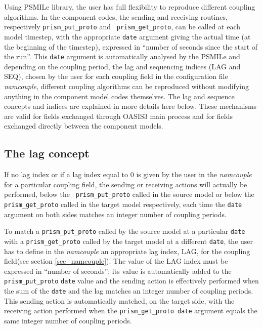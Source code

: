 Using PSMILe library, the user has full flexibility to reproduce
different coupling algorithms. In the component codes, the sending and
receiving routines, respectively {\tt prism\_put\_proto} and {\tt
  prism\_get\_proto}, can be called at each model timestep, with the
appropriate {\tt date} argument giving the actual time (at the
beginning of the timestep), expressed in ``number of seconds since the
start of the run''. This {\tt date} argument is automatically analysed
by the PSMILe
and depending on the coupling period, the
lag and sequencing indices (LAG and SEQ), chosen by the user for each
coupling field in the configuration file {\it namcouple}, different
coupling algorithms can be reproduced without modifying anything in the
component model codes themselves. The lag and sequence concepts and
indices are explained in more details here below. These mechanisms
are valid for fields exchanged through OASIS3 main
process and for fields exchanged directly between the component
models.

\subsection{The lag concept}
\label{subsub_lag}

If no lag index or if a lag index equal to 0 is given by the user in
the {\it namcouple} for a particular coupling field, the sending or
receiving actions will actually be performed, below the {\tt
  prism\_put\_proto} called in the source model or below the {\tt
  prism\_get\_proto} called in the target model respectively, each time the
{\tt date} argument on both sides matches an integer number of
coupling periods.
 
\vspace*{0.5cm}

To match a {\tt prism\_put\_proto} called by the source model at a
particular {\tt date} with a {\tt prism\_get\_proto} called by the target
model at a different {\tt date}, the user has to define in the {\it
namcouple} an appropriate lag index, LAG, for the coupling field(see
section \ref{sec_namcouple}). The value of the LAG index must be
expressed in ``number of seconds''; its value is automatically added
to the {\tt prism\_put\_proto} {\tt date} value and the sending action is
effectively performed when the sum of the {\tt date} and the lag matches an
integer number of coupling periods. This sending action is
automatically matched, on the target side, with the receiving action
performed when the {\tt prism\_get\_proto date} argument equals the
same integer number of coupling periods.


